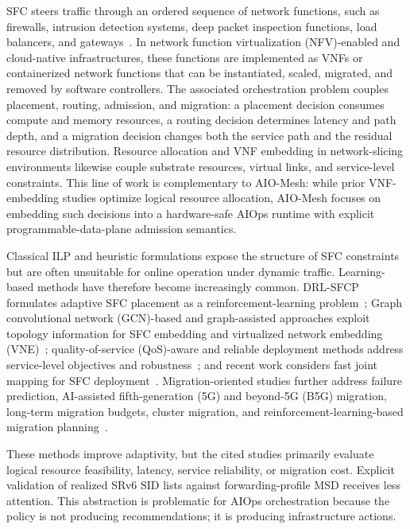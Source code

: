 \documentclass[final,5p]{elsarticle}
\newcommand{\rev}[1]{\textcolor{revisiongreen}{#1}}
\let\newrev\rev
\begin{document}
\rev{SFC} steers traffic through an ordered sequence of network functions, such as firewalls, intrusion detection systems, deep packet inspection functions, load balancers, and gateways~\cite{rfc7665}. In \rev{network function virtualization (NFV)}-enabled and cloud-native infrastructures, these functions are implemented as VNFs or containerized network functions that can be instantiated, scaled, migrated, and removed by software controllers. The associated orchestration problem couples placement, routing, admission, and migration: a placement decision consumes compute and memory resources, a routing decision determines latency and path depth, and a migration decision changes both the service path and the residual resource distribution. \newrev{Resource allocation and VNF embedding in network-slicing environments likewise couple substrate resources, virtual links, and service-level constraints.} This line of work is complementary to AIO-Mesh: while prior VNF-embedding studies optimize logical resource allocation, AIO-Mesh focuses on embedding such decisions into a hardware-safe AIOps runtime with explicit programmable-data-plane admission semantics.

Classical ILP and heuristic formulations expose the structure of SFC constraints but are often unsuitable for online operation under dynamic traffic. Learning-based methods have therefore become increasingly common. DRL-SFCP formulates adaptive SFC placement as a reinforcement-learning problem~\cite{wang2021drl}; \newrev{Graph convolutional network (GCN)}-based and graph-assisted approaches exploit topology information for SFC embedding and virtualized network embedding \newrev{(VNE)}~\cite{xiao2023twostage,pei2025graph,liu2024sfcml}; \newrev{quality-of-service (QoS)}-aware and reliable deployment methods address service-level objectives and robustness~\cite{taktak2024drl,li2023qosaware,qu2021reliable}; and recent work considers fast joint mapping for SFC deployment~\cite{wu2025drl}. Migration-oriented studies further address failure prediction, AI-assisted \newrev{fifth-generation (5G) and beyond-5G (B5G)} migration, long-term migration budgets, cluster migration, and reinforcement-learning-based migration planning~\cite{zhai2023migration,addad2022ai,qin2023sfcmigrationbudget,afrasiabi2024cluster,zhang2025sfcmigration,hu2026rlpmo}.

These methods improve adaptivity, but \rev{the cited studies primarily evaluate logical resource feasibility, latency, service reliability, or migration cost. Explicit validation of realized SRv6 SID lists against forwarding-profile MSD receives less attention.} This abstraction is problematic for AIOps orchestration because the policy is not producing recommendations; it is producing infrastructure actions.
\end{document}
